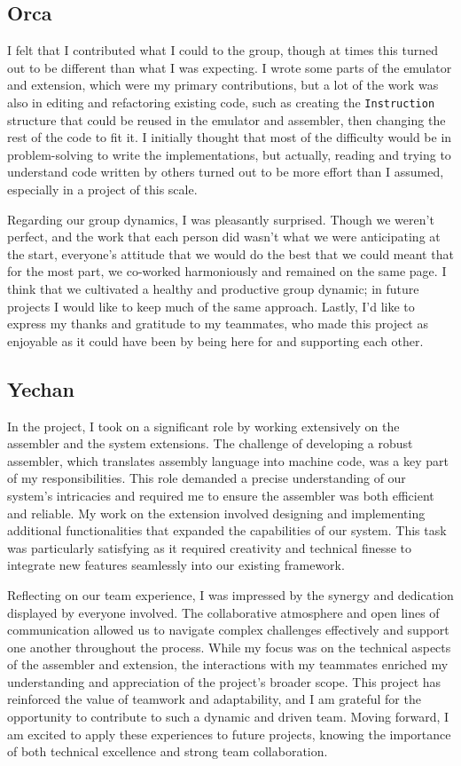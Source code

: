 \documentclass{article}
\begin{document}
\subsection{Orca}

I felt that I contributed what I could to the group, though at times this turned out to be different than what I was expecting. I wrote some parts of the emulator and extension, which were my primary contributions, but a lot of the work was also in editing and refactoring existing code, such as creating the \texttt{Instruction} structure that could be reused in the emulator and assembler, then changing the rest of the code to fit it. I initially thought that most of the difficulty would be in problem-solving to write the implementations, but actually, reading and trying to understand code written by others turned out to be more effort than I assumed, especially in a project of this scale.

Regarding our group dynamics, I was pleasantly surprised. Though we weren’t perfect, and the work that each person did wasn’t what we were anticipating at the start, everyone’s attitude that we would do the best that we could meant that for the most part, we co-worked harmoniously and remained on the same page. I think that we cultivated a healthy and productive group dynamic; in future projects I would like to keep much of the same approach. Lastly, I’d like to express my thanks and gratitude to my teammates, who made this project as enjoyable as it could have been by being here for and supporting each other.

\subsection{Yechan}

In the project, I took on a significant role by working extensively on the assembler and the system extensions. The challenge of developing a robust assembler, which translates assembly language into machine code, was a key part of my responsibilities. This role demanded a precise understanding of our system's intricacies and required me to ensure the assembler was both efficient and reliable. My work on the extension involved designing and implementing additional functionalities that expanded the capabilities of our system. This task was particularly satisfying as it required creativity and technical finesse to integrate new features seamlessly into our existing framework.

Reflecting on our team experience, I was impressed by the synergy and dedication displayed by everyone involved. The collaborative atmosphere and open lines of communication allowed us to navigate complex challenges effectively and support one another throughout the process. While my focus was on the technical aspects of the assembler and extension, the interactions with my teammates enriched my understanding and appreciation of the project's broader scope. This project has reinforced the value of teamwork and adaptability, and I am grateful for the opportunity to contribute to such a dynamic and driven team. Moving forward, I am excited to apply these experiences to future projects, knowing the importance of both technical excellence and strong team collaboration.
\end{document}

